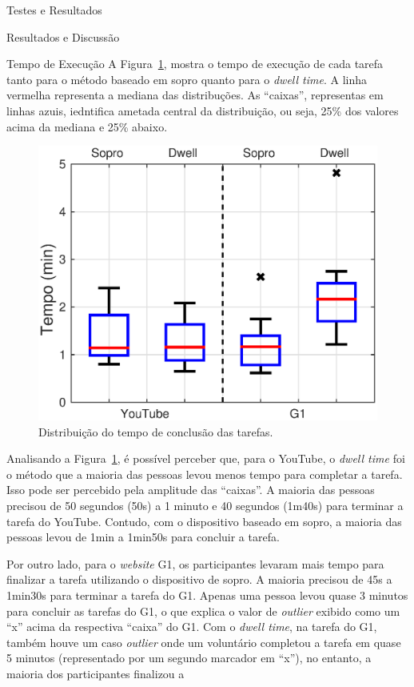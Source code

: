 \begin{chapter}{Testes e Resultados}
\begin{section}{Resultados e Discussão}
\begin{subsection}{Tempo de Execução}
A Figura~\ref{fig:tempo}, mostra o tempo de execução de cada tarefa tanto para o
método baseado em sopro quanto para o \textit{dwell time}. A linha vermelha
representa a mediana das distribuções. As ``caixas'', representas em linhas
azuis, iedntifica  ametada central da distribuição, ou seja, 25\% dos valores
acima da mediana e 25\% abaixo.

\begin{figure}[!h]
	\centering
	\includegraphics[width=1.00\linewidth]{fig/time}
	\caption{Distribuição do tempo de conclusão das tarefas.}
	\label{fig:tempo}
\end{figure}

Analisando a Figura~\ref{fig:tempo}, é possível perceber que, para o YouTube, o
\textit{dwell time} foi o método que a maioria das pessoas levou menos tempo
para completar a tarefa. Isso pode ser percebido pela amplitude das ``caixas''.
A maioria das pessoas precisou de 50 segundos (50s) a 1 minuto e 40 segundos
(1m40s) para terminar a tarefa do YouTube. Contudo, com o dispositivo baseado em
sopro, a maioria das pessoas levou de 1min a 1min50s para concluir a tarefa.

Por outro lado, para o \textit{website} G1, os participantes levaram mais tempo
para finalizar a tarefa utilizando o dispositivo de sopro. A maioria precisou de
45s a 1min30s para terminar a tarefa do G1. Apenas uma pessoa levou quase 3
minutos para concluir as tarefas do G1, o que explica o valor de
\textit{outlier} exibido como um ``x'' acima da respectiva ``caixa'' do G1. Com
o \textit{dwell time}, na tarefa do G1, também houve um caso \textit{outlier}
onde um voluntário completou a tarefa em quase 5 minutos (representado por um
segundo marcador em ``x''), no entanto, a maioria dos participantes finalizou a


\end{subsection}
\end{section}
\end{chapter}
